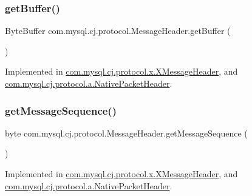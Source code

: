 \subsubsection{\texorpdfstring{get\+Buffer()}{getBuffer()}}
{\footnotesize\ttfamily Byte\+Buffer com.\+mysql.\+cj.\+protocol.\+Message\+Header.\+get\+Buffer (\begin{DoxyParamCaption}{ }\end{DoxyParamCaption})}



Implemented in \mbox{\hyperlink{classcom_1_1mysql_1_1cj_1_1protocol_1_1x_1_1_x_message_header_a5afa56bd029e353dd7f93b86e43a692f}{com.\+mysql.\+cj.\+protocol.\+x.\+X\+Message\+Header}}, and \mbox{\hyperlink{classcom_1_1mysql_1_1cj_1_1protocol_1_1a_1_1_native_packet_header_a4a2e68d77caa301eab35d33743c8a9ae}{com.\+mysql.\+cj.\+protocol.\+a.\+Native\+Packet\+Header}}.

\mbox{\label{interfacecom_1_1mysql_1_1cj_1_1protocol_1_1_message_header_addc9db095cb10062d2a3b0e3ad180750}} 
\subsubsection{\texorpdfstring{get\+Message\+Sequence()}{getMessageSequence()}}
{\footnotesize\ttfamily byte com.\+mysql.\+cj.\+protocol.\+Message\+Header.\+get\+Message\+Sequence (\begin{DoxyParamCaption}{ }\end{DoxyParamCaption})}



Implemented in \mbox{\hyperlink{classcom_1_1mysql_1_1cj_1_1protocol_1_1x_1_1_x_message_header_abfa0f85a9c79c4b91d062b6bf8e52d8b}{com.\+mysql.\+cj.\+protocol.\+x.\+X\+Message\+Header}}, and \mbox{\hyperlink{classcom_1_1mysql_1_1cj_1_1protocol_1_1a_1_1_native_packet_header_aa711f4d714447b1e2cd4901af7f4d824}{com.\+mysql.\+cj.\+protocol.\+a.\+Native\+Packet\+Header}}.

\mbox{\label{interfacecom_1_1mysql_1_1cj_1_1protocol_1_1_message_header_a8192e2c73dd6c3ed31e569034950f163}} 

